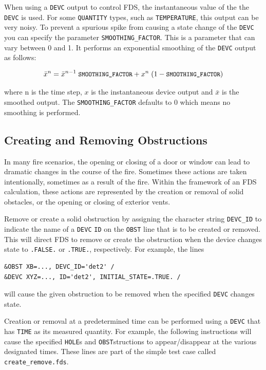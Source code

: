 \documentclass[11pt]{book}
\newcommand{\ct}{\tt\small}
\newcommand{\be}{\begin{equation}}
\newcommand{\ee}{\end{equation}}
\begin{document}
When using a {\ct DEVC} output to control FDS, the instantaneous value of the the {\ct DEVC} is used.  For some {\ct QUANTITY} types, such as {\ct TEMPERATURE}, this output can be very noisy.  To prevent a spurious spike from causing a state change of the {\ct DEVC} you can specify the parameter {\ct SMOOTHING\_FACTOR}.  This is a parameter that can vary between 0 and 1.  It performs an exponential smoothing of the {\ct DEVC} output as follows:

\be
\bar{x}^n=\bar{x}^{n-1} \; \mbox{\ct SMOOTHING\_FACTOR} + x^n \; (1-\mbox{\ct SMOOTHING\_FACTOR})
\ee

\noindent
where n is the time step, $x$ is the instantaneous device output and $\bar{x}$ is the smoothed output.  The {\ct SMOOTHING\_FACTOR} defaults to 0 which means no smoothing is performed.

\subsection{Creating and Removing Obstructions}
\label{info:create_remove}

In many fire scenarios, the opening or closing of a door or window
can lead to dramatic changes in the course of the fire. Sometimes these
actions are taken intentionally, sometimes as a result of the fire.
Within the framework of an FDS calculation, these actions are
represented by the creation or removal of solid obstacles, or the
opening or closing of exterior vents.

Remove or create a solid obstruction by assigning the character string {\ct DEVC\_ID} to indicate the name of
a {\ct DEVC} {\ct ID} on the {\ct OBST} line that is to be created or removed.  This will direct
FDS to remove or create the obstruction when
the device changes state to {\ct .FALSE.} or {\ct .TRUE.}, respectively. For example, the lines

\footnotesize
\begin{verbatim}
&OBST XB=..., DEVC_ID='det2' /
&DEVC XYZ=..., ID='det2', INITIAL_STATE=.TRUE. /
\end{verbatim}
\normalsize

\noindent
will cause the given obstruction to be removed when the specified {\ct DEVC} changes state.

Creation or removal at a predetermined time can be performed using a {\ct DEVC} that has {\ct TIME} as
its measured quantity. For example, the following instructions will cause the specified {\ct HOLE}s and {\ct OBST}structions to
appear/disappear at the various designated times. These lines are part of the simple test case called {\ct create\_remove.fds}.
\end{document}
